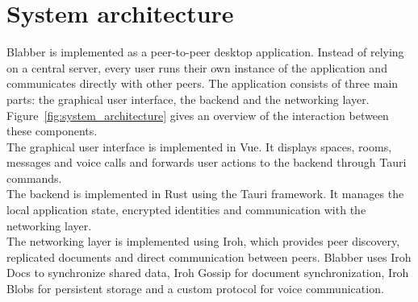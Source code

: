 \documentclass{article} %
\begin{document}
\section{System architecture}
Blabber is implemented as a peer-to-peer desktop application. Instead of relying on a central server, every user runs their own instance of the application and communicates directly with other peers. The application consists of three main parts: the graphical user interface, the backend and the networking layer. Figure~\ref{fig:system_architecture} gives an overview of the interaction between these components.\\
The graphical user interface is implemented in Vue. It displays spaces, rooms, messages and voice calls and forwards user actions to the backend through Tauri commands.\\
The backend is implemented in Rust using the Tauri framework. It manages the local application state, encrypted identities and communication with the networking layer.\\
The networking layer is implemented using Iroh, which provides peer discovery, replicated documents and direct communication between peers. Blabber uses Iroh Docs to synchronize shared data, Iroh Gossip for document synchronization, Iroh Blobs for persistent storage and a custom protocol for voice communication.
\end{document}
